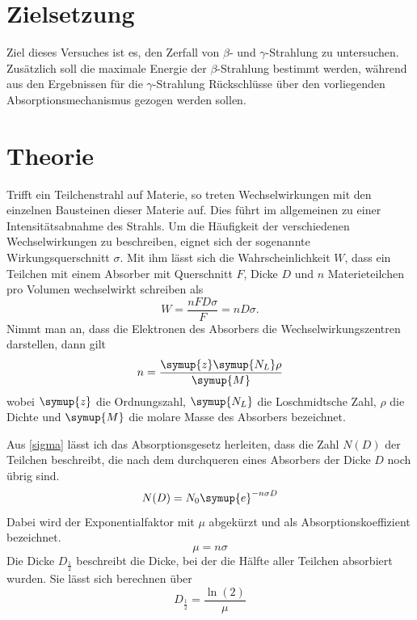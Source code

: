 \section{Zielsetzung}
Ziel dieses Versuches ist es, den Zerfall von $\beta$- und $\gamma$-Strahlung zu untersuchen.
Zusätzlich soll die maximale Energie der $\beta$-Strahlung bestimmt werden, während
aus den Ergebnissen für die $\gamma$-Strahlung Rückschlüsse über den vorliegenden
Absorptionsmechanismus gezogen werden sollen.

\section{Theorie}
\label{sec:Theorie}

Trifft ein Teilchenstrahl auf Materie, so treten Wechselwirkungen mit den einzelnen Bausteinen dieser
Materie auf. Dies führt im allgemeinen zu einer Intensitätsabnahme des Strahls.
Um die Häufigkeit der verschiedenen Wechselwirkungen zu beschreiben, eignet sich der sogenannte
Wirkungsquerschnitt $\sigma$.
Mit ihm lässt sich die Wahrscheinlichkeit $W$, dass ein Teilchen mit einem Absorber mit Querschnitt $F$,
Dicke $D$ und $n$ Materieteilchen pro Volumen wechselwirkt schreiben als
\begin{equation}
    \label{sigma}
    W=\frac{nFD\sigma}{F}=nD\sigma.
\end{equation}
Nimmt man an, dass die Elektronen des Absorbers die Wechselwirkungszentren darstellen, dann gilt
\begin{equation}
    \label{n}
    n=\frac{\symup{z} \symup{N_L} \rho}{\symup{M}}
\end{equation}
wobei $\symup{z}$ die Ordnungszahl, $\symup{N_L}$ die Loschmidtsche Zahl, $\rho$ die Dichte und $\symup{M}$
die molare Masse des Absorbers bezeichnet.

Aus \eqref{sigma} lässt ich das Absorptionsgesetz herleiten, dass die Zahl $N(D)$ der Teilchen beschreibt, die nach dem
durchqueren eines Absorbers der Dicke $D$ noch übrig sind.
\begin{equation}
    \label{Absorptionsgesetz}
    N(D)=N_0 \symup{e}^{-n \sigma D}
\end{equation}
Dabei wird der Exponentialfaktor mit $\mu$ abgekürzt und als Absorptionskoeffizient bezeichnet.
\begin{equation}
    \label{mu}
    \mu =n\sigma
\end{equation}
Die Dicke $D_{\frac{1}{2}}$ beschreibt die Dicke, bei der die Hälfte aller Teilchen absorbiert wurden.
Sie lässt sich berechnen über
\begin{equation}
    \label{D halb}
    D_{\frac{1}{2}}=\frac{\ln(2)}{\mu}
\end{equation}

